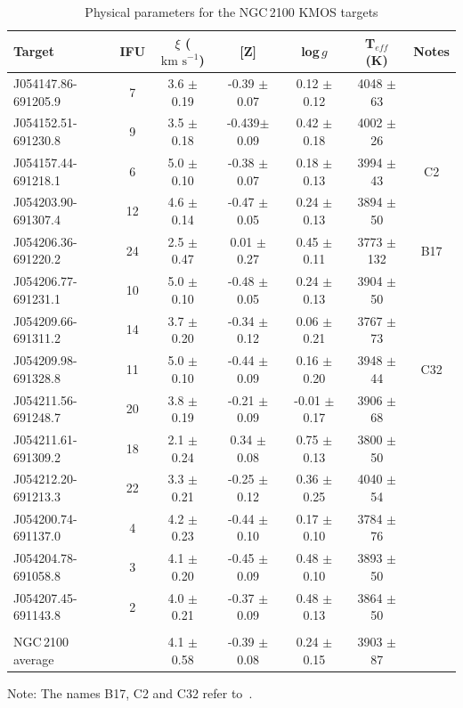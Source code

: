 \documentclass[useAMS,usenatbib]{mn2e}
\def\kms{$\mbox{km s}^{-1}$}
\begin{document}
\begin{table}
\begin{center}
\caption{
Physical parameters for the NGC\,2100 KMOS targets
\label{tb:stellar-params}
         }
\scriptsize
\begin{threeparttable}
\begin{tabular}{lc ccccc}
 \hline
 \hline
  Target  & IFU & $\xi$ (\kms) & [Z] & log\,$g$ & T$_{eff}$ (K) & Notes\\
  \hline
J054147.86-691205.9 & 7  & 3.6 $\pm$ 0.19 & -0.39 $\pm$ 0.07 &  0.12 $\pm$ 0.12 & 4048 $\pm$ 63 & \\
J054152.51-691230.8 & 9  & 3.5 $\pm$ 0.18 & -0.439$\pm$ 0.09 &  0.42 $\pm$ 0.18 & 4002 $\pm$ 26 & \\
J054157.44-691218.1 & 6  & 5.0 $\pm$ 0.10 & -0.38 $\pm$ 0.07 &  0.18 $\pm$ 0.13 & 3994 $\pm$ 43 & C2\\
J054203.90-691307.4 & 12 & 4.6 $\pm$ 0.14 & -0.47 $\pm$ 0.05 &  0.24 $\pm$ 0.13 & 3894 $\pm$ 50 & \\
J054206.36-691220.2 & 24 & 2.5 $\pm$ 0.47 &  0.01 $\pm$ 0.27 &  0.45 $\pm$ 0.11 & 3773 $\pm$ 132 & B17\\
J054206.77-691231.1 & 10 & 5.0 $\pm$ 0.10 & -0.48 $\pm$ 0.05 &  0.24 $\pm$ 0.13 & 3904 $\pm$ 50 & \\
J054209.66-691311.2 & 14 & 3.7 $\pm$ 0.20 & -0.34 $\pm$ 0.12 &  0.06 $\pm$ 0.21 & 3767 $\pm$ 73 & \\
J054209.98-691328.8 & 11 & 5.0 $\pm$ 0.10 & -0.44 $\pm$ 0.09 &  0.16 $\pm$ 0.20 & 3948 $\pm$ 44 & C32\\
J054211.56-691248.7 & 20 & 3.8 $\pm$ 0.19 & -0.21 $\pm$ 0.09 & -0.01 $\pm$ 0.17 & 3906 $\pm$ 68 & \\
J054211.61-691309.2 & 18 & 2.1 $\pm$ 0.24 &  0.34 $\pm$ 0.08 &  0.75 $\pm$ 0.13 & 3800 $\pm$ 50 & \\
J054212.20-691213.3 & 22 & 3.3 $\pm$ 0.21 & -0.25 $\pm$ 0.12 &  0.36 $\pm$ 0.25 & 4040 $\pm$ 54 & \\
J054200.74-691137.0 & 4  & 4.2 $\pm$ 0.23 & -0.44 $\pm$ 0.10 &  0.17 $\pm$ 0.10 & 3784 $\pm$ 76 & \\
J054204.78-691058.8 & 3  & 4.1 $\pm$ 0.20 & -0.45 $\pm$ 0.09 &  0.48 $\pm$ 0.10 & 3893 $\pm$ 50 & \\
J054207.45-691143.8 & 2  & 4.0 $\pm$ 0.21 & -0.37 $\pm$ 0.09 &  0.48 $\pm$ 0.13 & 3864 $\pm$ 50 & \\
\\
NGC\,2100 average      & & 4.1 $\pm$ 0.58 & -0.39 $\pm$ 0.08 &  0.24 $\pm$ 0.15 & 3903 $\pm$ 87 &\\

  \hline
  \end{tabular}
\begin{tablenotes}
    \item Note: The names B17, C2 and C32 refer to~{\protect\citet{1974A&AS...15..261R}}.
\end{tablenotes}
  \end{threeparttable}
  \end{center}
\end{table}
\end{document}
